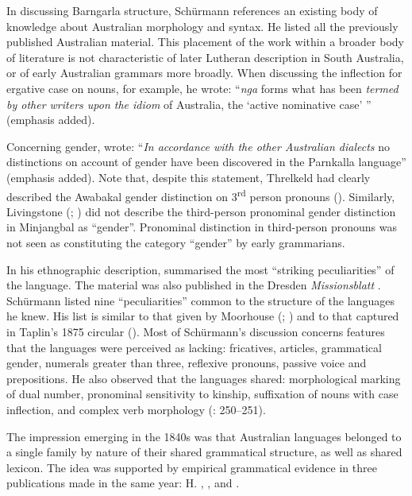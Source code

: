 In discussing Barngarla structure, Schürmann references an existing body of knowledge about Australian morphology and syntax. He listed \citeyearpar[v]{schurmann_vocabulary_1844} all the previously published Australian material. This placement of the work within a broader body of literature is not characteristic of later Lutheran description in South Australia, or of early Australian grammars more broadly. When discussing the inflection for ergative case on nouns, for example, he wrote: “\textit{nga} forms what has been \textit{termed by other writers upon the idiom} of Australia, the `active nominative case' ” (emphasis added).

Concerning gender, \citet[3]{schurmann_vocabulary_1844} wrote: “\textit{In accordance with the other Australian dialects} no distinctions on account of gender have been discovered in the Parnkalla language” (emphasis added). Note that, despite this statement, Threlkeld had clearly described the Awabakal gender distinction on 3\textsuperscript{rd} person pronouns (). Similarly, Livingstone (\citeyear{Livingstone1892}; ) did not describe the third-person pronominal gender distinction in Minjangbal as ``gender''. Pronominal distinction in third-person pronouns was not seen as constituting the category “gender” by early grammarians.

In his ethnographic description, \citet[29--30]{schurmann_aboriginal_1846} summarised the most “striking peculiarities” of the language. The material was also published in the Dresden \textit{Missionsblatt} \citep{rathjen_difficult_1998}. Schürmann listed nine “peculiarities” common to the structure of the languages he knew. His list is similar to that given by Moorhouse (\citeyear{moorhouse_vocabulary_1846}; ) and to that captured in Taplin’s 1875 circular (). Most of Schürmann’s discussion concerns features that the languages were perceived as lacking: fricatives, articles, grammatical gender, numerals greater than three, reflexive pronouns, passive voice and prepositions. He also observed that the languages shared: morphological marking of dual number, pronominal sensitivity to kinship, suffixation of nouns with case inflection, and complex verb morphology (\citeyear{moorhouse_vocabulary_1846}: 250--251).

The impression emerging in the 1840s was that Australian languages belonged to a single family \citep{grey_languages_1845} by nature of their shared grammatical structure, as well as shared lexicon. The idea was supported by empirical grammatical evidence in three publications made in the same year: H. \citet[479]{hale_languages_1846}, \citet[vi]{moorhouse_vocabulary_1846}, and \citet[29--30]{schurmann_aboriginal_1846}.

